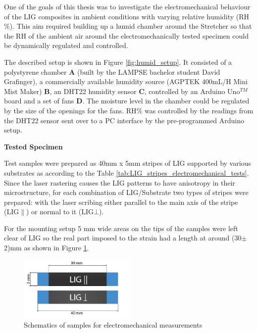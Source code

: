 One of the goals of this thesis was to investigate the electromechanical behaviour of the LIG composites in ambient conditions with varying relative humidity (RH$\%$). This aim required building up a humid chamber around the Stretcher so that the RH of the ambient air around the electromechanically tested specimen could be dynamically regulated and controlled.

The described setup is shown in Figure \ref{fig:humid_setup}. It consisted of a polystyrene chamber \textbf{A} (built by the LAMPSE bachelor student David Grafinger), a commercially available humidity source (AGPTEK 400mL/H Mini Mist Maker) \textbf{B}, an DHT22 humidity sensor \textbf{C}, controlled by an Arduino Uno$^{TM}$ board and a set of fans \textbf{D}. The moisture level in the chamber could be regulated by the size of the openings for the fans. RH$\%$ was controlled by the readings from the DHT22 sensor sent over to a PC interface by the pre-programmed Arduino setup. 

\medskip
\textbf{Tested Specimen}

Test samples were prepared as 40mm x 5mm stripes of LIG supported by various substrates as according to the Table \ref{tab:LIG_stripes_electromechanical_tests}. Since the laser rastering  causes the LIG patterns to have anisotropy in their microstructure, for each combination of LIG/Substrate two types of stripes were prepared: with the laser scribing either parallel to the main axis of the stripe (LIG$\parallel$) or normal to it (LIG$\bot$). 

For the mounting setup 5 mm wide areas on the tips of the samples were left clear of LIG so the real part imposed to the strain had a length at around (30$\pm$2)mm as shown in Figure \ref{fig:stretching_specimen}. 

\begin{figure}[H]
\centering
\includegraphics[width=0.5\textwidth]{Figures/ExperimentalSetup/Stretching-Specimen.jpg}
\medskip
\caption{Schematics of samples for electromechanical measurements}
\label{fig:stretching_specimen}
\end{figure}

